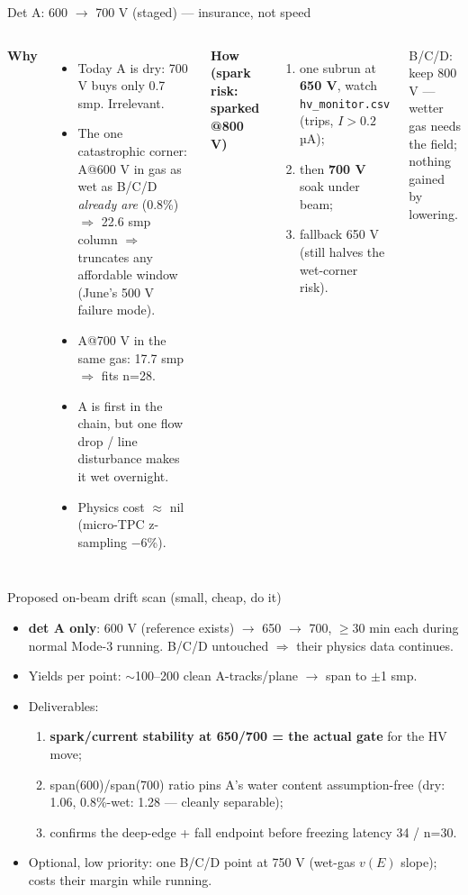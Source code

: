 \documentclass[10pt,aspectratio=169]{beamer}
\newcommand{\bad}[1]{\textcolor{okred}{#1}}
\begin{document}
\begin{frame}{Det A: 600 $\to$ 700 V (staged) --- insurance, not speed}
  \begin{columns}[T]
    \textbf{Why}
    \begin{itemize}
      \item Today A is dry: 700 V buys only 0.7 smp. Irrelevant.
      \item \bad{The one catastrophic corner}: A@600 V in gas as wet as B/C/D \emph{already are} (0.8\%) $\Rightarrow$ 22.6 smp column $\Rightarrow$ truncates any affordable window (June's 500 V failure mode).
      \item A@700 V in the same gas: 17.7 smp $\Rightarrow$ fits n=28.
      \item A is first in the chain, but one flow drop / line disturbance makes it wet overnight.
      \item Physics cost $\approx$ nil (micro-TPC z-sampling $-$6\%).
    \end{itemize}
    \textbf{How (spark risk: sparked @800 V)}
    \begin{enumerate}
      \item one subrun at \textbf{650 V}, watch \texttt{hv\_monitor.csv} (trips, $I>0.2$ µA);
      \item then \textbf{700 V} soak under beam;
      \item fallback 650 V (still halves the wet-corner risk).
    \end{enumerate}
    \vspace{0.5em}
    B/C/D: keep 800 V --- wetter gas needs the field; nothing gained by lowering.
  \end{columns}
\end{frame}

\begin{frame}{Proposed on-beam drift scan (small, cheap, do it)}
  \begin{itemize}
    \item \textbf{det A only}: 600 V (reference exists) $\to$ 650 $\to$ 700, $\geq$30 min each during normal Mode-3 running. B/C/D untouched $\Rightarrow$ their physics data continues.
    \item Yields per point: $\sim$100--200 clean A-tracks/plane $\to$ span to $\pm$1 smp.
    \item Deliverables:
      \begin{enumerate}
        \item \textbf{spark/current stability at 650/700 = the actual gate} for the HV move;
        \item span(600)/span(700) ratio pins A's water content assumption-free (dry: 1.06, 0.8\%-wet: 1.28 --- cleanly separable);
        \item confirms the deep-edge + fall endpoint before freezing latency 34 / n=30.
      \end{enumerate}
    \item Optional, low priority: one B/C/D point at 750 V (wet-gas $v(E)$ slope); costs their margin while running.
  \end{itemize}
\end{frame}
\end{document}
